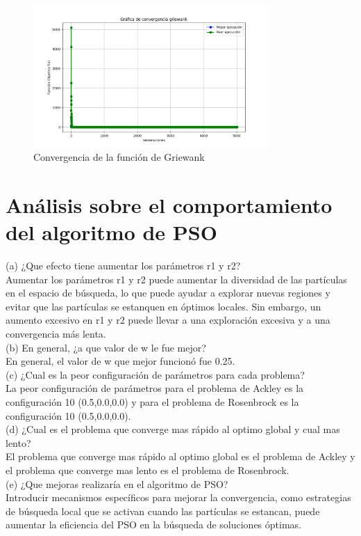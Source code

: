 \documentclass{report}
\begin{document}
    \begin{figure}[H]
        \centering
        \includegraphics[width=0.8\textwidth]{griewank.png}
        \caption{Convergencia de la función de Griewank}
        \label{fig:griewank}
    \end{figure}
    \section{Análisis sobre el comportamiento del algoritmo de PSO}
    (a)  ¿Que efecto tiene aumentar los parámetros r1 y r2?\\
    Aumentar los parámetros r1 y r2 puede aumentar la diversidad de las partículas en el espacio de búsqueda, lo que puede ayudar a explorar nuevas regiones y evitar que las partículas se estanquen en óptimos locales. Sin embargo, un aumento excesivo en r1 y r2 puede llevar a una exploración excesiva y a una convergencia más lenta.\\
    (b)  En general, ¿a que valor de w le fue mejor?\\
    En general, el valor de w que mejor funcionó fue 0.25.\\
    (c)  ¿Cual es la peor configuración de parámetros para cada problema?\\
    La peor configuración de parámetros para el problema de Ackley es la configuración 10 (0.5,0.0,0.0) y para el problema de Rosenbrock es la configuración 10 (0.5,0.0,0.0).\\
    (d)  ¿Cual es el problema que converge mas rápido al optimo global y cual mas lento?\\
    El problema que converge mas rápido al optimo global es el problema de Ackley y el problema que converge mas lento es el problema de Rosenbrock.\\
    (e)  ¿Que mejoras realizaría en el algoritmo de PSO?\\ 
    Introducir mecanismos específicos para mejorar la convergencia, como estrategias de búsqueda local que se activan cuando las partículas se estancan, puede aumentar la eficiencia del PSO en la búsqueda de soluciones óptimas.  
\end{document}
